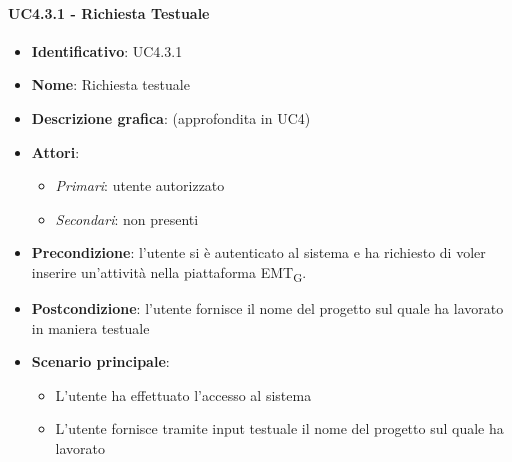 \paragraph{UC4.3.1 - Richiesta Testuale}
\begin{itemize}
   \item \textbf{Identificativo}: UC4.3.1
   \item \textbf{Nome}: Richiesta testuale
   \item \textbf{Descrizione grafica}: (approfondita in UC4)
   \item \textbf{Attori}:
   \begin{itemize} 
       \item \textit{Primari}: utente autorizzato
       \item \textit{Secondari}: non presenti
   \end{itemize}
       \item \textbf{Precondizione}: l'utente si è autenticato al sistema e ha richiesto di voler inserire un'attività nella piattaforma EMT\textsubscript{G}. 
       \item \textbf{Postcondizione}: l'utente fornisce il nome del progetto sul quale ha lavorato in maniera testuale
    \item \textbf{Scenario principale}: 
       \begin{itemize}
           \item L'utente ha effettuato l'accesso al sistema 
           \item L'utente fornisce tramite input testuale il nome del progetto sul quale ha lavorato
       \end{itemize}
\end{itemize}

